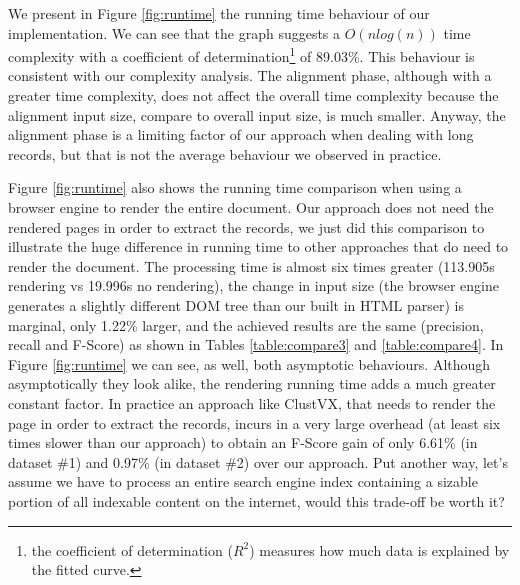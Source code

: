 \documentclass{vldb}
\begin{document}
We present in Figure \ref{fig:runtime} the running time behaviour of our
implementation. We can see that the graph suggests a $O(nlog(n))$ time
complexity with a coefficient of determination\footnote{the coefficient of
determination ($R^2$) measures how much data is explained by the fitted curve.}
of 89.03\%. This behaviour is consistent with our complexity analysis. The
alignment phase, although with a greater time complexity, does not affect the
overall time complexity because the alignment input size, compare to overall
input size, is much smaller. Anyway, the alignment phase is a limiting factor of
our approach when dealing with long records, but that is not the average
behaviour we observed in practice. 

Figure \ref{fig:runtime} also shows the running time comparison when using a
browser engine to render the entire document. Our approach does not need the
rendered pages in order to extract the records, we just did this comparison to
illustrate the huge difference in running time to other approaches that do need
to render the document. The processing time is almost six times greater
(113.905s rendering vs 19.996s no rendering), the change in input size (the
browser engine generates a slightly different DOM tree than our built in HTML
parser) is marginal, only 1.22\% larger, and the achieved results are the
same (precision, recall and F-Score) as shown in Tables \ref{table:compare3} and
\ref{table:compare4}. In Figure \ref{fig:runtime} we can see, as well, both
asymptotic behaviours.
Although asymptotically they look alike, the rendering running time adds a much
greater constant factor. In practice an approach like ClustVX, that needs to
render the page in order to extract the records, incurs in a very large overhead
(at least six times slower than our approach) to obtain an F-Score gain of only
6.61\% (in dataset \#1) and 0.97\% (in dataset \#2) over our approach. Put
another way, let's assume we have to process an entire search engine index
containing a sizable portion of all indexable content on the internet, would
this trade-off be worth it?
\end{document}
